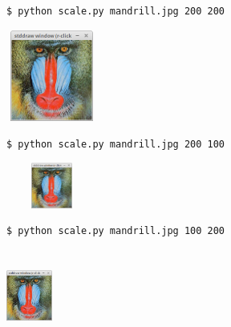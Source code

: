 \documentclass[8pt,a4paper,compress,handout]{beamer}
\begin{document}
\begin{frame}[fragile]
\begin{minipage}{150pt}
\begin{lstlisting}[language={}]
$ python scale.py mandrill.jpg 200 200
\end{lstlisting}
\end{minipage}%
\begin{minipage}{150pt}
\hfill \includegraphics[width=3cm,height=3cm]{figures/scale1.png}
\end{minipage}%

\bigskip

\begin{minipage}{150pt}
\begin{lstlisting}[language={}]
$ python scale.py mandrill.jpg 200 100
\end{lstlisting}
\end{minipage}%
\begin{minipage}{150pt}
\hfill \includegraphics[width=3cm,height=1.5cm]{figures/scale1.png}
\end{minipage}%

\bigskip

\begin{minipage}{150pt}
\begin{lstlisting}[language={}]
$ python scale.py mandrill.jpg 100 200
\end{lstlisting}
\end{minipage}%
\begin{minipage}{150pt}
\hfill \includegraphics[width=1.5cm,height=3cm]{figures/scale1.png}
\end{minipage}%
\end{frame}
\end{document}
